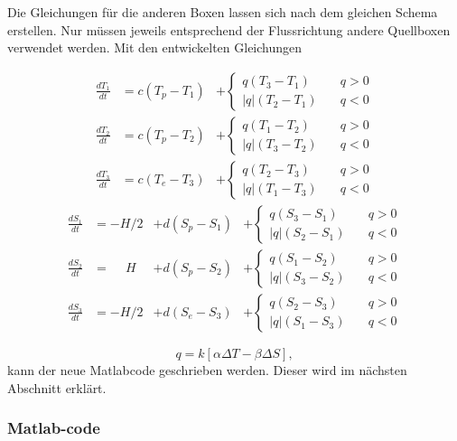 Die Gleichungen für die anderen Boxen lassen sich nach dem gleichen Schema erstellen. Nur müssen jeweils entsprechend der Flussrichtung andere Quellboxen verwendet werden. Mit den entwickelten Gleichungen 

\begin{equation}
\begin{aligned}
\frac{dT_1}{dt} &= c(T_p-T_1)&+ \begin{cases} q(T_3-T_1) & \quad q>0 \\ |q|(T_2-T_1) & \quad q<0 \end{cases}
\\
\frac{dT_2}{dt} &= c(T_p-T_2)&+\begin{cases} q(T_1-T_2) & \quad q>0 \\ |q|(T_3-T_2) & \quad q<0 \end{cases}
\\
\frac{dT_3}{dt} &= c(T_e-T_3)&+\begin{cases} q(T_2-T_3) & \quad q>0 \\ |q|(T_1-T_3) & \quad q<0 \end{cases}
\end{aligned}
\end{equation}
\begin{equation}
\begin{aligned}
\frac{dS_1}{dt} &= -H/2 &+ d(S_p-S_1)&+\begin{cases} q(S_3-S_1) & \quad q>0 \\ |q|(S_2-S_1) & \quad q<0 \end{cases}
\\
\frac{dS_2}{dt} &= \phantom{-}H &+ d(S_p-S_2)&+\begin{cases} q(S_1-S_2) & \quad q>0 \\ |q|(S_3-S_2) & \quad q<0 \end{cases}	
\\
\frac{dS_3}{dt} &= -H/2 &+d(S_e-S_3)&+\begin{cases} q(S_2-S_3) & \quad q>0 \\ |q|(S_1-S_3) & \quad q<0 \end{cases}
\end{aligned}
\end{equation}

\begin{equation}
q = k[\alpha\Delta T-\beta\Delta S],
\end{equation}
kann der neue Matlabcode geschrieben werden. Dieser wird im nächsten Abschnitt erklärt.


\subsubsection{Matlab-code}


